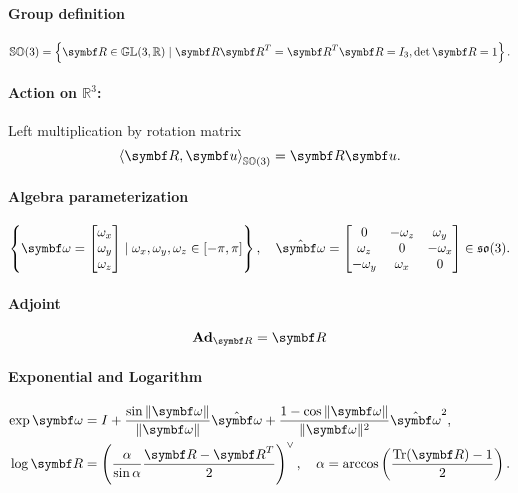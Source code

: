 \begin{properties}[breakable, title={$\SOthree$ formula sheet}]
  \paragraph{Group definition}
  \begin{equation}
    \SOthree = \left\{ \bR \in \GL(3, \mathbb{R}) \mid \bR \bR^{T} = \bR^{T} \bR = I_{3}, \det \bR = 1 \right\}.
  \end{equation}

  \paragraph{Action on $\mathbb{R}^3$:} Left multiplication by rotation matrix
  \begin{equation}
    \left \langle \bR, \bu \right \rangle_\SOthree = \bR \bu.
  \end{equation}

  \paragraph{Algebra parameterization}
  \begin{equation}
    \left\{ \bomega = \begin{bmatrix} \omega_{x} \\ \omega_{y} \\ \omega_{z} \end{bmatrix}
    \mid \omega_{x}, \omega_{y}, \omega_{z} \in [-\pi, \pi] \right\}, \quad \hat \bomega = \begin{bmatrix} 0 & -\omega_{z} & \omega_{y} \\ \omega_{z} & 0 & -\omega_{x} \\ -\omega_{y} & \omega_{x} & 0 \end{bmatrix} \in \sothree.
  \end{equation}

  \paragraph{Adjoint}
  \begin{equation}
    \label{eq:so3_Ad}
    \bAd_{\bR} = \bR
  \end{equation}

  \paragraph{Exponential and Logarithm}
  \begin{subequations}
    \begin{align}
      \label{eq:so3_exp}
      \exp \bomega & = I + \frac{\sin \| \bomega \|}{\|\bomega \|} \hat {\bomega} + \frac{1 - \cos \| \bomega \|}{\| \bomega \|^2} \hat {\bomega}^2,        \\
      \label{eq:so3_log}
      \log \bR     & = \left(\frac{\alpha}{\sin \alpha} \frac{\bR - \bR^T}{2} \right)^{\vee}, \quad \alpha = \arccos \left( \frac{\tr(\bR) - 1}{2} \right).
    \end{align}
  \end{subequations}


\end{properties}
